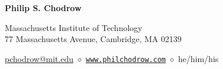 \documentclass[11pt,fullpage]{article}
\def\name{Philip S. Chodrow}
\begin{document}


\centerline{\Large \bf \name}



\begin{center}
Massachusetts Institute of Technology \\ 
77 Massachusetts Avenue, Cambridge, MA 02139

\url{pchodrow@mit.edu} $\diamond$  \href{https://www.philchodrow.com}{\texttt{www.philchodrow.com}} $\diamond$ he/him/his
\end{center}



\end{document}
